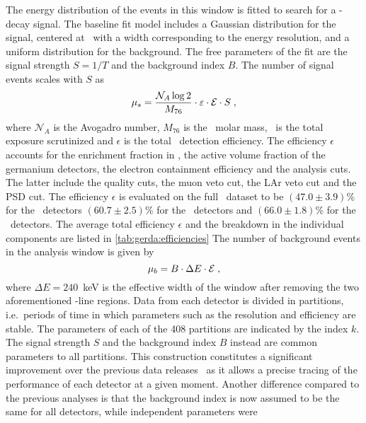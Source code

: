 The energy distribution of the events in this window is fitted to search for a \onbb-decay
signal. The baseline fit model includes a Gaussian distribution for the signal, centered
at \qbb\ with a width corresponding to the energy resolution, and a uniform distribution
for the background. The free parameters of the fit are the signal strength $S=1/T$ and the
background index $B$. The number of signal events scales with $S$ as
\begin{equation}\label{eq:gerda:mu_s}
  \mu_s = \frac{\mathcal{N}_A \log2}{M_{76}} \cdot \varepsilon \cdot \mathcal{E} \cdot S \;,
\end{equation}
where $\mathcal{N}_A$ is the Avogadro number, $M_{76}$ is the \gesix\ molar mass, \expo\
is the total exposure scrutinized and $\epsilon$ is the total \onbb\ detection efficiency.
The efficiency $\epsilon$ accounts for the enrichment fraction in \gesix, the active
volume fraction of the germanium detectors, the electron containment efficiency and the
analysis cuts. The latter include the quality cuts, the muon veto cut, the LAr veto cut
and the PSD cut. The efficiency $\epsilon$ is evaluated on the full \phasetwo\ dataset to
be $(47.0 \pm 3.9)$\% for the \scoax\ detectors $(60.7 \pm 2.5)$\% for the \bege\ detectors
and $(66.0 \pm 1.8)$\% for the \icoax\ detectors. The average total efficiency $\epsilon$
and the breakdown in the individual components are listed in \cref{tab:gerda:efficiencies}
The number of background events in the analysis window is given by
\begin{equation}\label{eq:gerda:mu_b}
  \mu_b = B \cdot \Delta{}E \cdot \mathcal{E} \;,
\end{equation}
where $\Delta{}E = 240$~keV is the effective width of the window after removing the two
aforementioned \g-line regions.
\newpar
Data from each detector is divided in partitions, i.e.~periods of time in which parameters
such as the resolution and efficiency are stable. The parameters of each of the 408
partitions are indicated by the index $k$. The signal strength $S$ and the background
index $B$ instead are common parameters to all partitions. This construction constitutes a
significant improvement over the previous data releases~\cite{Agostini2019a, Agostini2018,
Agostini2017} as it allows a precise tracing of the performance of each detector at a
given moment. Another difference compared to the previous analyses is that the background
index is now assumed to be the same for all detectors, while independent parameters were
